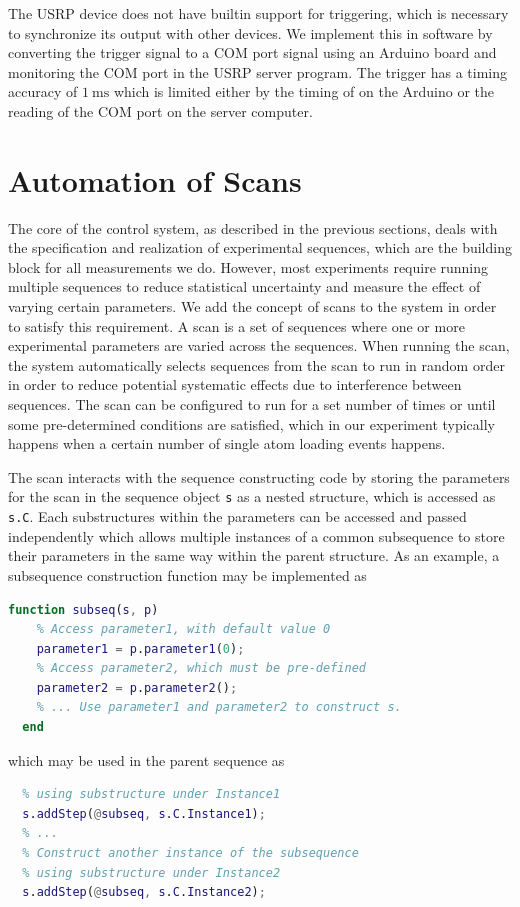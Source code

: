 The USRP device does not have builtin support for triggering,
which is necessary to synchronize its output with other devices.
We implement this in software by converting the trigger signal to a COM port signal
using an Arduino board and monitoring the COM port in the USRP server program.
The trigger has a timing accuracy of $1~\mathrm{ms}$
which is limited either by the timing of on the Arduino or
the reading of the COM port on the server computer.

\section{Automation of Scans}
\label{ch:computer-control:scan}

The core of the control system, as described in the previous sections,
deals with the specification and realization of experimental sequences,
which are the building block for all measurements we do.
However, most experiments require running multiple sequences
to reduce statistical uncertainty and measure the effect of varying certain parameters.
We add the concept of scans to the system in order to satisfy this requirement.
A scan is a set of sequences where one or more experimental parameters are varied
across the sequences.
When running the scan, the system automatically selects sequences
from the scan to run in random order in order to reduce potential systematic effects
due to interference between sequences.
The scan can be configured to run for a set number of times
or until some pre-determined conditions are satisfied,
which in our experiment typically happens
when a certain number of single atom loading events happens.

The scan interacts with the sequence constructing code
by storing the parameters for the scan in the sequence object \verb`s` as a nested structure,
which is accessed as \verb`s.C`.
Each substructures within the parameters can be accessed and passed independently
which allows multiple instances of a common subsequence
to store their parameters in the same way within the parent structure.
As an example, a subsequence construction function may be implemented as
\begin{lstlisting}[language=Matlab]
  function subseq(s, p)
    % Access parameter1, with default value 0
    parameter1 = p.parameter1(0);
    % Access parameter2, which must be pre-defined
    parameter2 = p.parameter2();
    % ... Use parameter1 and parameter2 to construct s.
  end
\end{lstlisting}
which may be used in the parent sequence as
\begin{lstlisting}[language=Matlab]
  % Construct one instance of the subsequence
  % using substructure under Instance1
  s.addStep(@subseq, s.C.Instance1);
  % ...
  % Construct another instance of the subsequence
  % using substructure under Instance2
  s.addStep(@subseq, s.C.Instance2);
\end{lstlisting}

